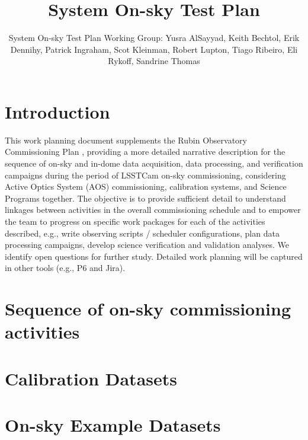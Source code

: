 \documentclass[SE,authoryear,toc,lsstdraft]{lsstdoc}
\title{System On-sky Test Plan}
\author{%
System On-sky Test Plan Working Group: Yusra AlSayyad, Keith Bechtol, Erik Dennihy, Patrick Ingraham, Scot Kleinman, Robert Lupton, Tiago Ribeiro, Eli Rykoff, Sandrine Thomas
}
\date{\vcsDate}
\begin{document}
\maketitle


\section{Introduction}

This work planning document supplements the Rubin Observatory Commissioning Plan , providing a more detailed narrative description for the sequence of on-sky and in-dome data acquisition, data processing, and verification campaigns during the period of LSSTCam on-sky commissioning, considering Active Optics System (AOS) commissioning, calibration systems, and Science Programs together.
The objective is to provide sufficient detail to understand linkages between activities in the overall commissioning schedule and to empower the team to progress on specific work packages for each of the activities described, e.g., write observing scripts / scheduler configurations, plan data processing campaigns, develop science verification and validation analyses.
We identify open questions for further study.
Detailed work planning will be captured in other tools (e.g., P6 and Jira).

\section{Sequence of on-sky commissioning activities}

\section{Calibration Datasets}



\section{On-sky Example Datasets}
\end{document}

